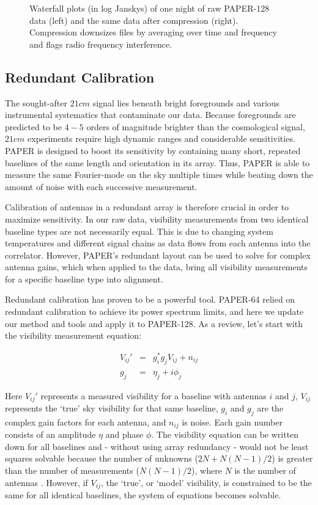 \documentclass[preprint2,numberedappendix,tighten,twocolappendix]{aastex6}  %
\begin{document}
\begin{figure}[!]
	\centering
	\caption{Waterfall plots (in log Janskys) of one night of raw PAPER-128 data (left) and the same data after compression (right). Compression downsizes files by averaging over time and frequency and flags radio frequency interference.}
	\label{fig:raw}
\end{figure}

\subsection{Redundant Calibration}

The sought-after $21 cm$ signal lies beneath bright foregrounds and various instrumental systematics that contaminate our data. Because foregrounds are predicted to be $4-5$ orders of magnitude brighter than the cosmological signal, $21 cm$ experiments require high dynamic ranges and considerable sensitivities. PAPER is designed to boost its sensitivity by containing many short, repeated baselines of the same length and orientation in its array. Thus, PAPER is able to measure the same Fourier-mode on the sky multiple times while beating down the amount of noise with each successive measurement.

Calibration of antennas in a redundant array is therefore crucial in order to maximize sensitivity. In our raw data, visibility measurements from two identical baseline types are not necessarily equal. This is due to changing system temperatures and different signal chains as data flows from each antenna into the correlator. However, PAPER's redundant layout can be used to solve for complex antenna gains, which when applied to the data, bring all visibility measurements for a specific baseline type into alignment. 

Redundant calibration has proven to be a powerful tool. PAPER-64 relied on redundant calibration to achieve its power spectrum limits, and here we update our method and tools and apply it to PAPER-128. As a review, let's start with the visibility measurement equation:

\begin{eqnarray}
\label{eq:viseq}
V_{ij}' &=& g_{i}^{*}g_{j}V_{ij} + n_{ij} \\
g_{j} &=&\eta_{j} + i\phi_{j}
\end{eqnarray}

Here $V_{ij}'$ represents a measured visibility for a baseline with antennas $i$ and $j$, $V_{ij}$ represents the `true' sky visibility for that same baseline, $g_{i}$ and $g_{j}$ are the complex gain factors for each antenna, and $n_{ij}$ is noise. Each gain number consists of an amplitude $\eta$ and phase $\phi$. The visibility equation can be written down for all baselines and - without using array redundancy - would not be least squares solvable because the number of unknowns ($2N+N(N-1)/2$) is greater than the number of measurements ($N(N-1)/2$), where $N$ is the number of antennas . However, if $V_{ij}$, the `true', or `model' visibility, is constrained to be the same for all identical baselines, the system of equations becomes solvable.
\end{document}
